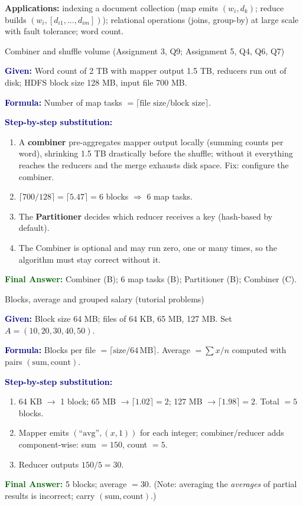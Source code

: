 \documentclass[11pt,a4paper,openany]{report}
\newcommand{\Given}{\par\textbf{\textcolor{navy}{Given:}} }
\newcommand{\Formula}{\par\textbf{\textcolor{navy}{Formula:}} }
\newcommand{\Steps}{\par\textbf{\textcolor{navy}{Step-by-step substitution:}}\par}
\newcommand{\Answer}{\par\textbf{\textcolor{darkgreen}{Final Answer:}} }
\begin{document}
\textbf{Applications:} indexing a document collection (map emits $(w_i, d_k)$; reduce builds $(w_i, [d_{i1},\dots,d_{im}])$); relational operations
(joins, group-by) at large scale with fault tolerance; word count.

\begin{solved}{Combiner and shuffle volume (Assignment 3, Q9; Assignment 5, Q4, Q6, Q7)}
\Given Word count of 2 TB with mapper output 1.5 TB, reducers run out of disk; HDFS block size 128 MB, input file 700 MB.
\Formula Number of map tasks $= \lceil \text{file size} / \text{block size} \rceil$.
\Steps
\begin{enumerate}[leftmargin=*]
  \item A \textbf{combiner} pre-aggregates mapper output locally (summing counts per word), shrinking 1.5 TB drastically before the shuffle; without it
        everything reaches the reducers and the merge exhausts disk space. Fix: configure the combiner.
  \item $\lceil 700/128 \rceil = \lceil 5.47 \rceil = 6$ blocks $\Rightarrow$ 6 map tasks.
  \item The \textbf{Partitioner} decides which reducer receives a key (hash-based by default).
  \item The Combiner is optional and may run zero, one or many times, so the algorithm must stay correct without it.
\end{enumerate}
\Answer Combiner (B); 6 map tasks (B); Partitioner (B); Combiner (C).
\end{solved}

\begin{solved}{Blocks, average and grouped salary (tutorial problems)}
\Given Block size 64 MB; files of 64 KB, 65 MB, 127 MB. Set $A = (10,20,30,40,50)$.
\Formula Blocks per file $=\lceil \text{size}/64\,\text{MB}\rceil$. Average $=\sum x / n$ computed with pairs $(\text{sum},\text{count})$.
\Steps
\begin{enumerate}[leftmargin=*]
  \item 64 KB $\to$ 1 block; 65 MB $\to \lceil 1.02\rceil = 2$; 127 MB $\to \lceil 1.98\rceil = 2$. Total $=5$ blocks.
  \item Mapper emits $(\text{``avg''}, (x,1))$ for each integer; combiner/reducer adds component-wise: sum $=150$, count $=5$.
  \item Reducer outputs $150/5 = 30$.
\end{enumerate}
\Answer 5 blocks; average $= 30$. (Note: averaging the \emph{averages} of partial results is incorrect; carry $(\text{sum},\text{count})$.)
\end{solved}
\end{document}

